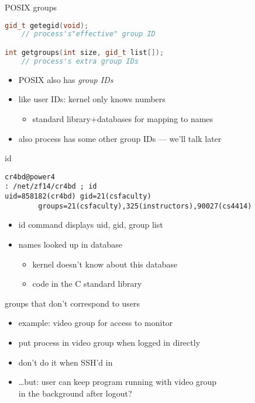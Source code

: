 \begin{frame}[fragile,label=posixGRoups]{POSIX groups}
\begin{lstlisting}[language=C++,style=small]
gid_t getegid(void);
    // process's"effective" group ID

int getgroups(int size, gid_t list[]);
    // process's extra group IDs
\end{lstlisting}
    \begin{itemize}
    \item POSIX also has \textit{group IDs}
    \item like user IDs: kernel only knows numbers
        \begin{itemize}
        \item standard library+databases for mapping to names
        \end{itemize}
    \item {\small also process has some other group IDs --- we'll talk later}
    \end{itemize}
\end{frame}

\begin{frame}[fragile,label=idCommand]{id}
\begin{lstlisting}[language={},style=small]
cr4bd@power4
: /net/zf14/cr4bd ; id
uid=858182(cr4bd) gid=21(csfaculty)
        groups=21(csfaculty),325(instructors),90027(cs4414)
\end{lstlisting}
\vspace{.5cm}
\begin{itemize}
\item id command displays uid, gid, group list
\item names looked up in database
    \begin{itemize}
    \item kernel doesn't know about this database
    \item code in the C standard library
    \end{itemize}
\end{itemize}
\end{frame}

\begin{frame}{groups that don't correspond to users}
    \begin{itemize}
    \item example: video group for access to monitor
    \vspace{.5cm}
    \item put process in video group when logged in directly
    \item don't do it when SSH'd in
    \vspace{.5cm}
    \item<2-> \ldots but: user can keep program running with video group \\ in the background after logout?
    \end{itemize}
\end{frame}
